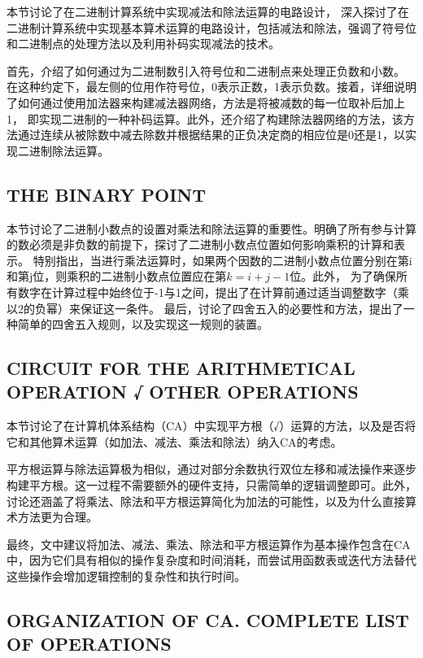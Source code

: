 \documentclass[12pt]{article} %
\theoremstyle{definition}
\begin{document}
本节讨论了在二进制计算系统中实现减法和除法运算的电路设计，
深入探讨了在二进制计算系统中实现基本算术运算的电路设计，包括减法和除法，强调了符号位和二进制点的处理方法以及利用补码实现减法的技术。

首先，介绍了如何通过为二进制数引入符号位和二进制点来处理正负数和小数。
在这种约定下，最左侧的位用作符号位，0表示正数，1表示负数。接着，详细说明了如何通过使用加法器来构建减法器网络，方法是将被减数的每一位取补后加上1，
即实现二进制的一种补码运算。此外，还介绍了构建除法器网络的方法，该方法通过连续从被除数中减去除数并根据结果的正负决定商的相应位是0还是1，以实现二进制除法运算。

\subsection{THE BINARY POINT}

本节讨论了二进制小数点的设置对乘法和除法运算的重要性。明确了所有参与计算的数必须是非负数的前提下，探讨了二进制小数点位置如何影响乘积的计算和表示。
特别指出，当进行乘法运算时，如果两个因数的二进制小数点位置分别在第i和第j位，则乘积的二进制小数点位置应在第\(k = i + j - 1\)位。此外，
为了确保所有数字在计算过程中始终位于-1与1之间，提出了在计算前通过适当调整数字（乘以2的负幂）来保证这一条件。
最后，讨论了四舍五入的必要性和方法，提出了一种简单的四舍五入规则，以及实现这一规则的装置。

\subsection{CIRCUIT FOR THE ARITHMETICAL OPERATION √ OTHER OPERATIONS}

本节讨论了在计算机体系结构（CA）中实现平方根（√）运算的方法，以及是否将它和其他算术运算（如加法、减法、乘法和除法）纳入CA的考虑。

平方根运算与除法运算极为相似，通过对部分余数执行双位左移和减法操作来逐步构建平方根。这一过程不需要额外的硬件支持，只需简单的逻辑调整即可。此外，讨论还涵盖了将乘法、除法和平方根运算简化为加法的可能性，以及为什么直接算术方法更为合理。

最终，文中建议将加法、减法、乘法、除法和平方根运算作为基本操作包含在CA中，因为它们具有相似的操作复杂度和时间消耗，而尝试用函数表或迭代方法替代这些操作会增加逻辑控制的复杂性和执行时间。

\subsection{ORGANIZATION OF CA. COMPLETE LIST OF OPERATIONS}
\end{document}
